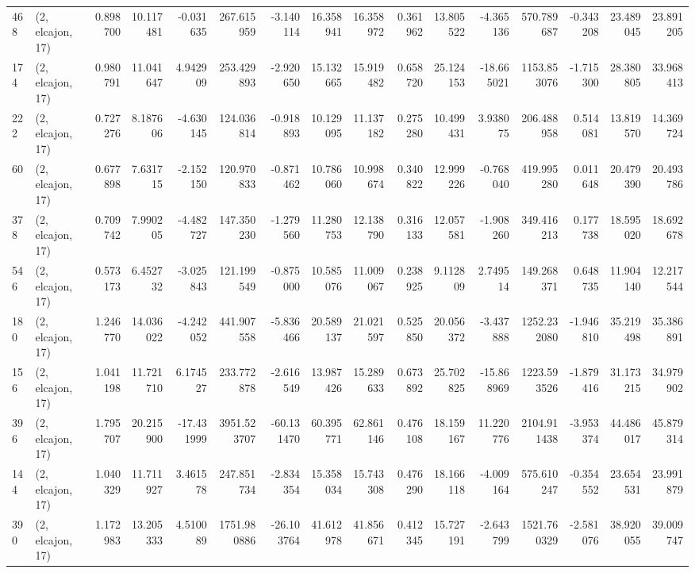 \begin{tabular}{llrrrrrrrrrrrrrr}
468 &  (2, elcajon, 17) &   0.898700 &  10.117481 &  -0.031635 &   267.615959 &  -3.140114 &  16.358941 &  16.358972 &  0.361962 &  13.805522 &  -4.365136 &    570.789687 &  -0.343208 &   23.489045 &   23.891205 \\
174 &  (2, elcajon, 17) &   0.980791 &  11.041647 &   4.942909 &   253.429893 &  -2.920650 &  15.132665 &  15.919482 &  0.658720 &  25.124153 & -18.665021 &   1153.853076 &  -1.715300 &   28.380805 &   33.968413 \\
222 &  (2, elcajon, 17) &   0.727276 &   8.187606 &  -4.630145 &   124.036814 &  -0.918893 &  10.129095 &  11.137182 &  0.275280 &  10.499431 &   3.938075 &    206.488958 &   0.514081 &   13.819570 &   14.369724 \\
60  &  (2, elcajon, 17) &   0.677898 &   7.631715 &  -2.152150 &   120.970833 &  -0.871462 &  10.786060 &  10.998674 &  0.340822 &  12.999226 &  -0.768040 &    419.995280 &   0.011648 &   20.479390 &   20.493786 \\
378 &  (2, elcajon, 17) &   0.709742 &   7.990205 &  -4.482727 &   147.350230 &  -1.279560 &  11.280753 &  12.138790 &  0.316133 &  12.057581 &  -1.908260 &    349.416213 &   0.177738 &   18.595020 &   18.692678 \\
546 &  (2, elcajon, 17) &   0.573173 &   6.452732 &  -3.025843 &   121.199549 &  -0.875000 &  10.585076 &  11.009067 &  0.238925 &   9.112809 &   2.749514 &    149.268371 &   0.648735 &   11.904140 &   12.217544 \\
180 &  (2, elcajon, 17) &   1.246770 &  14.036022 &  -4.242052 &   441.907558 &  -5.836466 &  20.589137 &  21.021597 &  0.525850 &  20.056372 &  -3.437888 &   1252.232080 &  -1.946810 &   35.219498 &   35.386891 \\
156 &  (2, elcajon, 17) &   1.041198 &  11.721710 &   6.174527 &   233.772878 &  -2.616549 &  13.987426 &  15.289633 &  0.673892 &  25.702825 & -15.868969 &   1223.593526 &  -1.879416 &   31.173215 &   34.979902 \\
396 &  (2, elcajon, 17) &   1.795707 &  20.215900 & -17.431999 &  3951.523707 & -60.131470 &  60.395771 &  62.861146 &  0.476108 &  18.159167 &  11.220776 &   2104.911438 &  -3.953374 &   44.486017 &   45.879314 \\
144 &  (2, elcajon, 17) &   1.040329 &  11.711927 &   3.461578 &   247.851734 &  -2.834354 &  15.358034 &  15.743308 &  0.476290 &  18.166118 &  -4.009164 &    575.610247 &  -0.354552 &   23.654531 &   23.991879 \\
390 &  (2, elcajon, 17) &   1.172983 &  13.205333 &   4.510089 &  1751.980886 & -26.103764 &  41.612978 &  41.856671 &  0.412345 &  15.727191 &  -2.643799 &   1521.760329 &  -2.581076 &   38.920055 &   39.009747 \\

\end{tabular}
